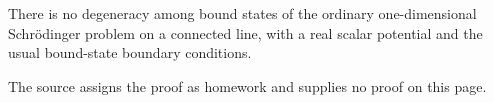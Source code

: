 There is no degeneracy among bound states of the ordinary
one-dimensional Schr\"odinger problem on a connected line, with a real
scalar potential and the usual bound-state boundary conditions.

The source assigns the proof as homework and supplies no proof on this page.

